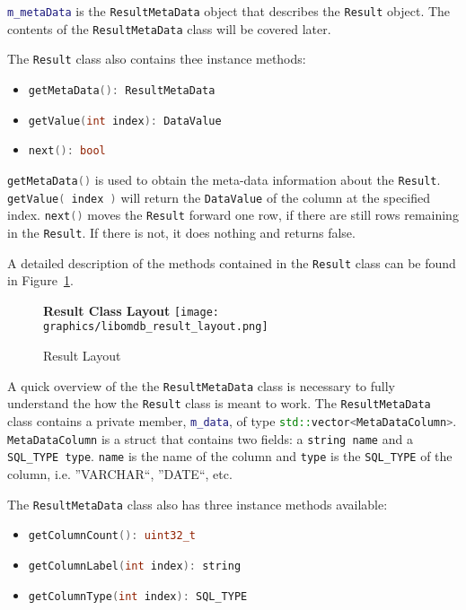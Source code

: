 \documentclass[letterpaper, 12pt]{article}
\newcommand{\inlinecode}[1]{\colorbox{codegrey}{\lstinline[language=C++]{#1}}}
\begin{document}
  \inlinecode{m_metaData} is the
  \inlinecode{ResultMetaData} object that describes the
  \inlinecode{Result} object. The contents of the
  \inlinecode{ResultMetaData} class will be covered later.
  \par\vspace{\baselineskip}
  The \inlinecode{Result} class also contains thee instance methods:
  \begin{itemize}
    \item \inlinecode{getMetaData(): ResultMetaData}
    \item \inlinecode{getValue(int index): DataValue}
    \item \inlinecode{next(): bool}
  \end{itemize}
  \inlinecode{getMetaData()} is used to obtain the meta-data
  information about the \inlinecode{Result}.
  \inlinecode{getValue( index )} will return the
  \inlinecode{DataValue} of the column at the specified index.
  \inlinecode{next()} moves the
  \inlinecode{Result} forward one row, if there are still rows
  remaining in the \inlinecode{Result}. If there is not, it does
  nothing and returns false.
  \par\vspace{\baselineskip}
  A detailed description of the methods contained in the \inlinecode{Result} class 
  can be found in Figure~\ref{fig:result_methods}.
  \begin{figure}
    \centering
    \label{fig:result_methods}
    \textbf{Result Class Layout}
    \texttt{[image: graphics/libomdb\_result\_layout.png]}
    \caption{Result Layout}
  \end{figure}
  \par\vspace{\baselineskip}
  A quick overview of the the \inlinecode{ResultMetaData} class is necessary to fully understand 
  the how the \inlinecode{Result} class is meant to work. The \inlinecode{ResultMetaData} class 
  contains a private member, \inlinecode{m_data}, of type \inlinecode{std::vector<MetaDataColumn>}.
  \inlinecode{MetaDataColumn} is a struct that contains two fields:
  a \inlinecode{string name} and a \inlinecode{SQL_TYPE type}. \inlinecode{name}
  is the name of the column and \inlinecode{type} is the
  \inlinecode{SQL_TYPE} of the column, i.e. ''VARCHAR``, ''DATE``, etc.
  \par\vspace{\baselineskip}
  The \inlinecode{ResultMetaData} class also has
  three instance methods available:
  \begin{itemize}
    \item \inlinecode{getColumnCount(): uint32_t}
    \item \inlinecode{getColumnLabel(int index): string}
    \item \inlinecode{getColumnType(int index): SQL_TYPE}
  \end{itemize}
\end{document}
